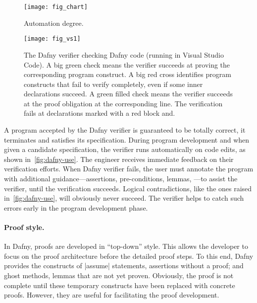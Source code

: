 \begin{figure}[ht]
\centering
\texttt{[image: fig\_chart]}
\caption[Automation degree chart]{Automation degree.}
\label{fig:dafny-auto}
\end{figure}

\begin{figure}[p]
\begin{center}
\texttt{[image: fig\_vs1]}
\end{center}
\caption[Dafny running in Visual Studio Code]{
The Dafny verifier checking Dafny code (running in Visual Studio Code).
A big green check{ }{ }\circledb[dafnyok]{\faCheck}{ }means the verifier succeeds at proving the corresponding program construct.
A big red cross{ }{ }\circledb[dafnyno]{\scalebox{1.25}{\faTimes}}{ }identifies program constructs that fail to verify completely, even if some inner declarations succeed.
A green filled check {\color{dafnyok}{\scalebox{.8}{\faCheckCircle}}} means the verifier succeeds at the proof obligation at the corresponding line.
The verification fails at declarations marked with a red block  and\;\;.
}\label{fig:dafny-use}
\end{figure}

A program accepted by the Dafny verifier is guaranteed to be totally correct, \ie it terminates and satisfies its specification.
During program development and when given a candidate specification, the verifier runs automatically on code edits, as shown in~\autoref{fig:dafny-use}.
The engineer receives immediate feedback on their verification efforts.
When Dafny verifier fails, the user must annotate the program with additional guidance---assertions, pre-conditions, lemmas, \etc---to assist the verifier, until the verification succeeds.
Logical contradictions, like the ones raised in~\autoref{fig:dafny-use}, will obviously never succeed.
The verifier helps to catch such errors early in the program development phase.

\paragraph*{Proof style.}
In Dafny, proofs are developed in \enquote{top-down} style.
This allows the developer to focus on the proof architecture before the detailed proof steps.
To this end, Dafny provides the constructs of \pr|assume| statements, \ie assertions without a proof;
and ghost methods, \ie lemmas that are not yet proven.
Obviously, the proof is not complete until these temporary constructs have been replaced with concrete proofs.
However, they are useful for facilitating the proof development.


